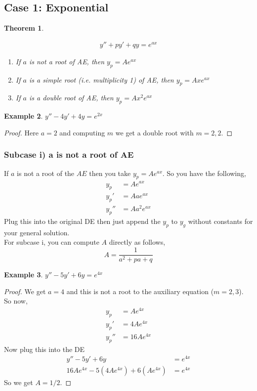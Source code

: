 \documentclass[oneside,11pt,pdftex,final]{book}%
\numberwithin{equation}{section}
\newtheorem{theorem}{Theorem}[chapter]%
\newtheorem{example}[theorem]{Example}
\numberwithin{section}{chapter}
\numberwithin{equation}{chapter}
\begin{document}
\subsection{Case 1: Exponential}
\begin{theorem}\label{th:udcexp}


\begin{align}
	y''+py'+qy=e^{ax} \label{eq:udcexp}
\end{align}
\begin{enumerate}
	\item If $ a $ is not a root of AE, then $ y_p =Ae^{ax}$
	\item If $ a $ is a simple root (i.e. multiplicity 1) of AE, then $ y_p=Ax e^{ax} $
	\item If $ a $ is a double root of AE, then $ y_p=A x^2 e^{ax} $
\end{enumerate}
\end{theorem}
\begin{example}
	$ y''-4y'+4y=e^{2x} $
\end{example}
\begin{proof}
	Here $ a=2 $ and computing $ m $ we get a double root with $ m=2,2 $.
\end{proof}

\subsubsection{Subcase i) a is not a root of AE}
If $ a $ is not a root of the $ AE $ then you take $ y_p=Ae^{ax}$. So you have the following,
\begin{align*}
	y_p&=Ae^{ax}\\
	y_p'&=Aae^{ax}\\
	y_p''&=Aa^2e^{ax}
\end{align*}
Plug this into the original DE then just append the $ y_p $ to $ y_g $ without constants for your general solution.\\

For subcase i, you can compute $ A $ directly as follows, \[ A=\frac{1}{a^2+pa+q} \]


\begin{example}
	$ y''-5y'+6y=e^{4x} $
\end{example}
\begin{proof}
	We get $ a=4 $ and this is not a root to the auxiliary equation ($ m=2,3 $).\\
	So now,
	\begin{align*}
		 y_p&=Ae^{4x}\\
		 y_p'&=4Ae^{4x}\\
		 y_p''&=16Ae^{4x}
	\end{align*}
Now plug this into the DE
\begin{align*}
	y''-5y'+6y&=e^{4x}\\
	16Ae^{4x}-5(4Ae^{4x})+6(Ae^{4x})&=e^{4x}
\end{align*}
So we get $ A=1/2 $.
\end{proof}
\end{document}
